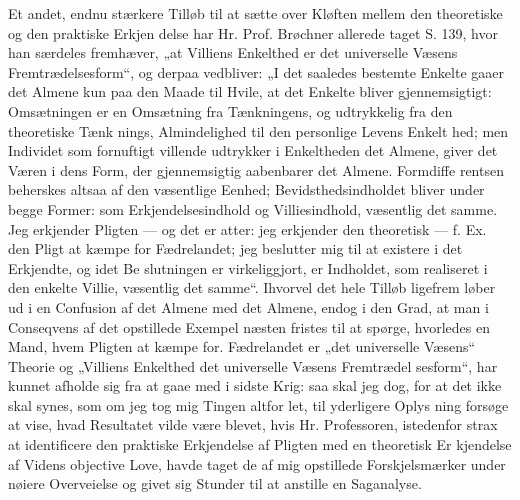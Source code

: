 \documentclass[12pt]{book}
\newcommand{\opage}[1]{\marginnote{\footnotesize\textit{[#1]}}}
\begin{document}
Et andet, endnu stærkere Tilløb til at sætte over
Kløften mellem den theoretiske og den praktiske Erkjen\-%
delse har Hr. Prof. Brøchner allerede taget S. 139,
hvor han særdeles fremhæver, „at Villiens Enkelthed er
det universelle Væsens Fremtrædelsesform“, og derpaa
vedbliver: „I det saaledes bestemte Enkelte gaaer det
Almene kun paa den Maade til Hvile, at det Enkelte
bliver gjennemsigtigt: Omsætningen er en Omsætning fra
Tænkningens, og udtrykkelig fra den theoretiske Tænk\-%
nings, Almindelighed til den personlige Levens Enkelt\-%
hed; men Individet som fornuftigt villende udtrykker
i Enkeltheden det Almene, giver det Væren i dens Form,
der gjennemsigtig aabenbarer det Almene. Formdiffe\-%
rentsen beherskes altsaa af den væsentlige Eenhed;
Bevidsthedsindholdet bliver under begge Former: som
Erkjendelsesindhold og Villiesindhold, væsentlig det samme.
Jeg erkjender Pligten --- og det er atter: jeg erkjender
den theoretisk --- f. Ex. den Pligt at kæmpe for Fædrelandet;
jeg beslutter mig til at existere i det Erkjendte, og idet Be\-%
slutningen er virkeliggjort, er Indholdet, som realiseret i den
enkelte Villie, væsentlig det samme“. Ihvorvel det hele
Tilløb ligefrem løber ud i en Confusion af det
Almene med det Almene, endog i den Grad, at man i
Conseqvens af det opstillede Exempel næsten fristes til
at spørge, hvorledes en Mand, hvem Pligten at kæmpe
for. Fædrelandet er „det universelle Væsens“ Theorie og
„Villiens Enkelthed det universelle Væsens Fremtrædel\-%
sesform“, har kunnet afholde sig fra at gaae med i sidste
Krig: saa skal jeg dog, for at det ikke skal synes, som
\opage{27}\setcounter{footnote}{0}%
om jeg tog mig Tingen altfor let, til yderligere Oplys\-%
ning forsøge at vise, hvad Resultatet vilde være blevet,
hvis Hr. Professoren, istedenfor strax at identificere den
praktiske Erkjendelse af Pligten med en theoretisk Er\-%
kjendelse af Videns objective Love, havde taget de af
mig opstillede Forskjelsmærker under nøiere Overveielse
og givet sig Stunder til at anstille en Saganalyse.
\end{document}
